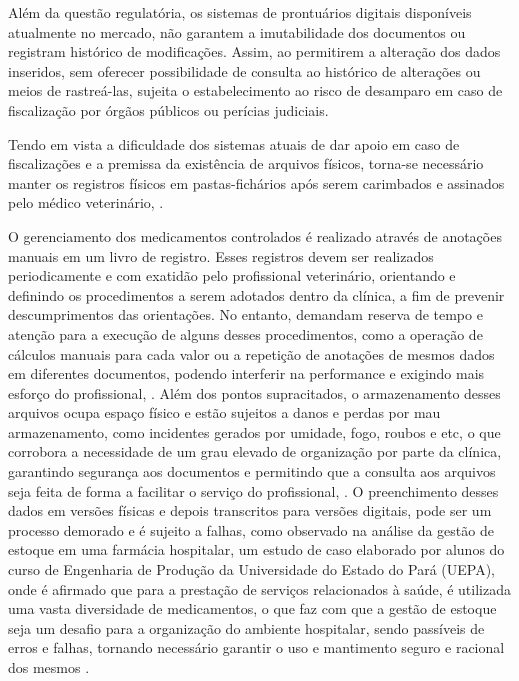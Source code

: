 \documentclass[
    12pt,               %
    openright,          %
    oneside,
    a4paper,            %
    BIBLATEX,           %
    TODO,               %
    english,            %
    brazil              %
    ]{ifsp-spo-inf-ctds}
\begin{document}
    Além da questão regulatória, os sistemas de prontuários digitais disponíveis atualmente no mercado, não garantem a imutabilidade dos documentos ou registram histórico de modificações. Assim, ao permitirem a alteração dos dados inseridos, sem oferecer possibilidade de consulta ao histórico de alterações ou meios de rastreá-las, sujeita o estabelecimento ao risco de desamparo em caso de fiscalização por órgãos públicos ou perícias judiciais.

    Tendo em vista a dificuldade dos sistemas atuais de dar apoio em caso de fiscalizações e a premissa da existência de arquivos físicos, torna-se necessário manter os registros físicos em pastas-fichários após serem carimbados e assinados pelo médico veterinário, .

    O gerenciamento dos medicamentos controlados é realizado através de anotações manuais em um livro de registro. Esses registros devem ser realizados periodicamente e com exatidão pelo profissional veterinário, orientando e definindo os procedimentos a serem adotados dentro da clínica, a fim de prevenir descumprimentos das orientações. No entanto, demandam reserva de tempo e atenção para a execução de alguns desses procedimentos, como a operação de cálculos manuais para cada valor ou a repetição de anotações de mesmos dados em diferentes documentos, podendo interferir na performance e exigindo mais esforço do profissional, .
    Além dos pontos supracitados, o armazenamento desses arquivos ocupa espaço físico e estão sujeitos a danos e perdas por mau armazenamento, como incidentes gerados por umidade, fogo, roubos e etc, o que corrobora a necessidade de um grau elevado de organização por parte da clínica, garantindo segurança aos documentos e permitindo que a consulta aos arquivos seja feita de forma a facilitar o serviço do profissional, . O preenchimento desses dados em versões físicas e depois transcritos para versões digitais, pode ser um processo demorado e é sujeito a falhas, como observado na análise da gestão de estoque em uma farmácia hospitalar, um estudo de caso elaborado por alunos do curso de Engenharia de Produção da Universidade do Estado do Pará (UEPA), onde é afirmado que para a prestação de serviços relacionados à saúde, é utilizada uma vasta diversidade de medicamentos, o que faz com que a gestão de estoque seja um desafio para a organização do ambiente hospitalar, sendo passíveis de erros e falhas, tornando necessário garantir o uso e mantimento seguro e racional dos mesmos . 
\end{document}

